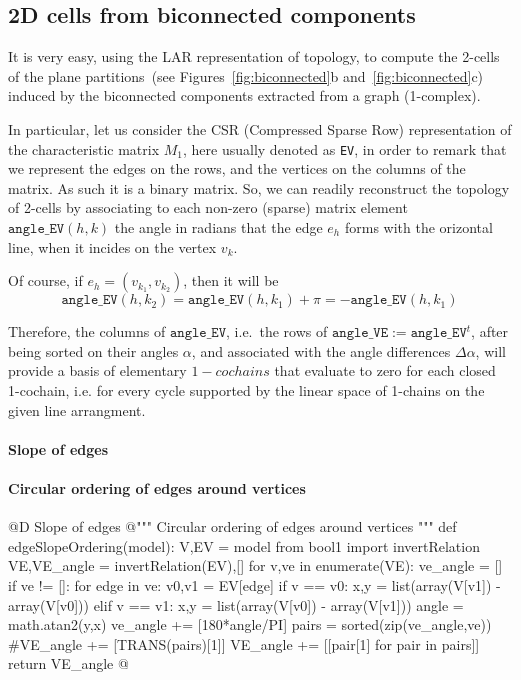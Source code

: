 \documentclass[11pt,oneside]{article}    %
\begin{document}
\subsection{2D cells from biconnected components}

It is very easy,  using the LAR representation of topology, to compute the 2-cells of the plane partitions~(see Figures~\ref{fig:biconnected}b and~\ref{fig:biconnected}c) induced by the biconnected components extracted from a graph (1-complex).

In particular, let us consider the CSR (Compressed Sparse Row) representation of the characteristic matrix $M_1$, here usually denoted as \texttt{EV}, in order to remark that we represent the edges on the rows, and the vertices on the columns of the matrix. As such it is a binary matrix. So, we can readily reconstruct the topology of 2-cells by associating to each non-zero (sparse) matrix element $\texttt{angle\_EV}(h,k)$ the angle in radians that the edge $e_h$ forms with the orizontal line, when it incides on the vertex $v_k$. 

Of course, if $e_h = (v_{k_1},v_{k_2})$, then it will be 
\[
\texttt{angle\_EV}(h,k_2) = \texttt{angle\_EV}(h,k_1)+\pi = -\texttt{angle\_EV}(h,k_1)
\]

Therefore, the columns of $\texttt{angle\_EV}$, i.e.~the rows of $\texttt{angle\_VE} := \texttt{angle\_EV}^t$,
after being sorted on their angles $\alpha$, and associated with the angle differences $\Delta\alpha$, will provide a basis of elementary $1-cochains$ that evaluate to zero for each closed 1-cochain, i.e. for every cycle supported by the linear space of 1-chains on the given line arrangment.


\paragraph{Slope of edges}

\paragraph{Circular ordering of edges around vertices}
@D Slope of edges
@{""" Circular ordering of edges around vertices """
def edgeSlopeOrdering(model):
    V,EV = model
    from bool1 import invertRelation
    VE,VE_angle = invertRelation(EV),[]
    for v,ve in enumerate(VE):
        ve_angle = []
        if ve != []:
            for edge in ve:
                v0,v1 = EV[edge]
                if v == v0:     x,y = list(array(V[v1]) - array(V[v0]))
                elif v == v1:    x,y = list(array(V[v0]) - array(V[v1]))
                angle = math.atan2(y,x)
                ve_angle += [180*angle/PI]
        pairs = sorted(zip(ve_angle,ve))
        #VE_angle += [TRANS(pairs)[1]]
        VE_angle += [[pair[1] for pair in pairs]]
    return VE_angle
@}
\end{document}
